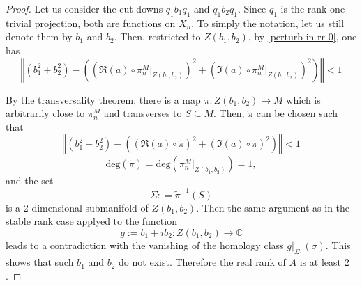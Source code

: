 \documentclass[12pt, oneside, psamsfonts]{amsart}
\theoremstyle{definition}
\theoremstyle{remark}
\numberwithin{equation}{section}
\newcommand{\norm}[1]{\left\Vert#1\right\Vert}
\newcommand{\Real}{\mathbb R}
\newcommand{\Comp}{\mathbb C}
\begin{document}
\begin{proof}
Let us consider the cut-downs $q_1b_1q_1$ and $q_1b_2q_1$. Since $q_1$ is the rank-one trivial projection, both are functions on $X_n$. To simply the notation, let us still denote them by $b_1$ and $b_2$. Then, restricted to $Z(b_1, b_2)$, by \eqref{perturb-in-rr-0}, one has 
\begin{equation}
\norm{(b_1^2 + b_2^2) - ((\Re(a) \circ \pi_n^M|_{Z(b_1, b_2)})^2 + (\Im(a) \circ \pi_n^M|_{Z(b_1, b_2)})^2) } < 1
\end{equation}


By the transversality theorem, there is a map $\tilde{\pi}: Z(b_1, b_2) \to M$ which is arbitrarily close to $\pi^M_{n}$ and transverses to $S \subseteq M$. Then, $\tilde{\pi}$ can be chosen such that 
\begin{equation}\label{approx-inv-rr}
\norm{(b_1^2 + b_2^2) - ((\Re(a) \circ \tilde{\pi})^2 + (\Im(a) \circ \tilde{\pi})^2) } < 1
\end{equation}
$$\mathrm{deg}(\tilde{\pi}) = \mathrm{deg}(\pi^M_{n}|_{Z(b_1, b_2)}) = 1, $$
and the set 
$$ \Sigma: = \tilde{\pi}^{-1}(S)$$ is a 2-dimensional submanifold of $Z(b_1, b_2)$. Then the same argument as in the stable rank case applyed to the function $$g:=b_1 + i b_2:  Z(b_1, b_2) \to \Comp$$
leads to a contradiction with the vanishing of the homology class $g|_{\Sigma_1}(\sigma)$. This shows that such $b_1$ and $b_2$ do not exist. Therefore the real rank of $A$ is at least $2$.
%
%
%
%
%
%

\end{proof}
\end{document}
